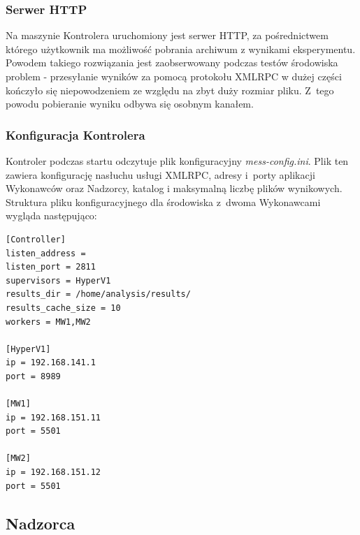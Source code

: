 \documentclass[a4paper,12pt,oneside]{article}
\begin{document}
	\subsubsection{Serwer HTTP}
		
	Na maszynie Kontrolera uruchomiony jest serwer HTTP, za pośrednictwem którego użytkownik ma możliwość pobrania archiwum z wynikami eksperymentu. Powodem takiego rozwiązania jest zaobserwowany podczas testów środowiska problem -  przesyłanie wyników za pomocą protokołu XMLRPC w dużej części kończyło się niepowodzeniem ze względu na zbyt duży rozmiar pliku. Z~tego powodu pobieranie wyniku odbywa się osobnym kanałem.

	\subsubsection{Konfiguracja Kontrolera}
	
	Kontroler podczas startu odczytuje plik konfiguracyjny \textit{mess-config.ini}. Plik ten zawiera konfigurację nasłuchu usługi XMLRPC, adresy i~porty aplikacji Wykonawców oraz Nadzorcy, katalog i maksymalną liczbę plików wynikowych. Struktura pliku konfiguracyjnego dla środowiska z~dwoma Wykonawcami wygląda następująco:
\begin{lstlisting}
[Controller]
listen_address =
listen_port = 2811
supervisors = HyperV1
results_dir = /home/analysis/results/
results_cache_size = 10
workers = MW1,MW2

[HyperV1]
ip = 192.168.141.1
port = 8989

[MW1]
ip = 192.168.151.11
port = 5501

[MW2]
ip = 192.168.151.12
port = 5501
\end{lstlisting}

	\subsection{Nadzorca}	
	
\end{document}
